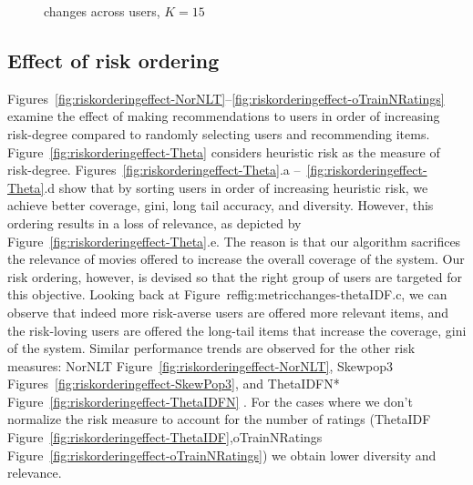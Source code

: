   
\begin{figure*}[htb]
\centering
{}
\caption{changes across users, $K=15$}
\label{fig:metricchanges-rho}
\end{figure*}


\subsection{Effect of risk ordering} Figures~\ref{fig:riskorderingeffect-NorNLT}--\ref{fig:riskorderingeffect-oTrainNRatings} examine the effect of making recommendations to users in order of increasing risk-degree  compared to randomly selecting users and recommending items. Figure~\ref{fig:riskorderingeffect-Theta} considers heuristic risk as the measure of risk-degree. Figures~\ref{fig:riskorderingeffect-Theta}.a --~\ref{fig:riskorderingeffect-Theta}.d show that by sorting users in order of increasing heuristic risk, we achieve better coverage, gini, long tail accuracy, and diversity.  However, this ordering results in a loss of relevance, as depicted by Figure~\ref{fig:riskorderingeffect-Theta}.e. The reason is that our algorithm sacrifices the relevance of movies offered to increase the overall coverage of the system. Our risk ordering, however, is devised so that the right group of users are targeted for this objective. Looking back at Figure~ref{fig:metricchanges-thetaIDF}.c, we can observe that indeed more risk-averse users 	are offered more relevant items, and the risk-loving users are offered the long-tail items that increase the coverage, gini of the system. Similar performance trends are observed for the other risk measures: NorNLT Figure~\ref{fig:riskorderingeffect-NorNLT}, Skewpop3 Figures~\ref{fig:riskorderingeffect-SkewPop3}, and ThetaIDFN* Figure~\ref{fig:riskorderingeffect-ThetaIDFN} . For the cases where we don't normalize the risk measure to account for the number of ratings (ThetaIDF Figure~\ref{fig:riskorderingeffect-ThetaIDF},oTrainNRatings Figure~\ref{fig:riskorderingeffect-oTrainNRatings}) we obtain lower diversity and relevance.


